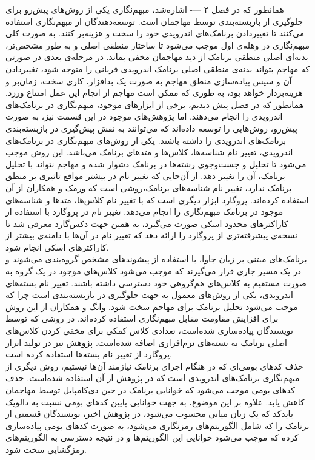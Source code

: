 همانطور که در فصل ۲ ---- اشاره‌شد، مبهم‌نگاری یکی از روش‌های پیش‌رو برای جلوگیری از بازبسته‌بندی توسط مهاجمان است. توسعه‌دهندگان از مبهم‌نگاری استفاده می‌کنند تا تغییردادن برنامک‌های اندرویدی خود را سخت و هزینه‌بر کنند. به صورت کلی مبهم‌نگاری در وهله‌ی اول موجب می‌شود تا ساختار منطقی اصلی و به طور مشخص‌تر، بدنه‌ای اصلی منطقی برنامک از دید مهاجمان مخفی بماند. در مرحله‌ی بعدی در صورتی که مهاجم بتواند بدنه‌‌ی منطقی اصلی برنامک‌ اندرویدی قربانی را متوجه شود، تغییردادن آن و سپس پیاده‌سازی منطق مهاجم به صورت یک بدافزار، کاری سخت، زمان‌بر و هزینه‌بردار خواهد بود، به طوری که ممکن است مهاجم از انجام این عمل امتناع ورزد. همانطور که در فصل پیش دیدیم، برخی از ابزار‌های موجود، مبهم‌نگاری در برنامک‌های اندرویدی را انجام می‌دهند. اما پژوهش‌های موجود در این قسمت نیز، به صورت پیش‌رو، روش‌هایی را توسعه داده‌اند که می‌توانند به نقش پیش‌گیری در بازبسته‌بندی برنامک‌های اندرویدی را داشته باشند.
یکی از روش‌های مبهم‌نگاری در برنامک‌های اندرویدی، تغییر نام شناسه‌ها، کلاس‌ها و متد‌های برنامک می‌باشد. این روش موجب می‌شود تا تحلیل و جست‌وجوی رشته‌ها در برنامک دشوار شده و مهاجم نتواند با تحلیل برنامک، آن را تغییر دهد. از آن‌جایی که تغییر نام در بیشتر مواقع تاثیری بر منطق برنامک ندارد، تغییر نام شناسه‌های برنامک،‌روشی است که ورمک و همکاران از آن استفاده کرده‌اند. پروگارد ابزار دیگری است که با تغییر نام کلاس‌ها، متد‌ها و شناسه‌های موجود در برنامک مبهم‌نگاری را انجام می‌دهد. تغییر نام در پروگارد با استفاده از کاراکتر‌های محدود اسکی صورت می‌گیرد، به همین جهت دکس‌گارد معرفی شد تا نسخه‌ی پیشرفته‌تری از پروگارد را ارائه دهد که تغییر نام در آن‌ها با دامنه‌ی بیشتر از کاراکتر‌های اسکی انجام شود.\\
برنامک‌های مبتنی بر زبان جاوا، با استفاده از پیشوند‌های مشخص گروه‌بندی می‌شوند و در یک مسیر جاری قرار می‌گیرند که موجب می‌شود کلاس‌های موجود در یک گروه به صورت مستقیم به کلاس‌های هم‌گروهی خود دسترسی داشته باشند. تغییر نام بسته‌های اندرویدی، یکی از روش‌های معمول به جهت جلوگیری در بازبسته‌بندی است چرا که موجب می‌شود تحلیل برنامک برای مهاجم سخت شود. وانگ و همکاران از این روش برای افزایش مقاومت مقابل مبهم‌نگاری استفاده کرده‌اند. در روشی که توسط نویسندگان پیاده‌سازی شده‌است، تعدادی کلاس کمکی برای مخفی کردن کلاس‌های اصلی برنامک به بسته‌های نرم‌افزاری اضافه‌ شده‌است. پژوهش نیز در تولید ابزار پروگارد از تغییر نام بسته‌ها استفاده کرده‌ است.\\
حذف کد‌های بومی‌ای که در هنگام اجرای برنامک نیازمند آن‌ها نیستیم، روش دیگری از مبهم‌نگاری برنامک‌های اندرویدی است که در پژوهش از آن استفاده شده‌است. حذف کد‌های بومی موجب می‌شود که خوانایی برنامک در حین دی‌کامپایل توسط مهاجمان کاهش یابد. علاوه بر این موضوع، به جهت خوانایی پایین کد‌های بومی نسبت به دالویک باید‌کد که یک زبان میانی محسوب می‌شود، در پژوهش اخیر، نویسندگان قسمتی از برنامک را که شامل الگوریتم‌های رمزنگاری می‌شود، به صورت کد‌های بومی پیاده‌سازی کرده که موجب می‌شود خوانایی این الگوریتم‌ها و در نتیجه دسترسی به الگوریتم‌های رمز‌گشایی سخت شود.\\
